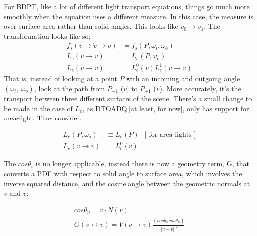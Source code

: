 \message{ !name(test.tex)}\documentclass{article}
\begin{document}
  For BDPT, like a lot of different light transport equations, things go much
more smoothly when the equation uses a different measure. In this case, the
measure is over surface area rather than solid angles. This looks like $v_0
\rightarrow v_1$. The transformation looks like so:
  \begin{align}
    f_s(v \rightarrow \dot{v} \rightarrow \ddot{v}) &= f_s(P, \omega_i,
                                                      \omega_o)\\
    L_e(v \rightarrow \dot{v}) &= L_e(P, \omega_o)\\
    L_e(v \rightarrow \dot{v}) &= L_e^0(v) L_e^1(v \rightarrow \dot{v})
  \end{align}
    That is, instead of looking at a point $P$ with an incoming and outgoing
    angle $(\omega_i,\:\omega_o)$, look at the path from $P_{-1}$ ($v$) to
    $P_{+1}$ ($\ddot{v}$). More accurately, it's the transport between
    three different surfaces of the scene. There's a small change to be made in
the case of $L_e$, as DTOADQ [at least, for now], only has support for
area-light. Thus consider:

  \begin{align}
    L_e(P, \omega_o) &\equiv L_e(P) &\text{[ for area lights ]}\\
    L_e(v \rightarrow \dot{v}) &= L_e^0(v)&
  \end{align}

    The $cos\theta_i$ is no longer applicable, instead there is now a geometry
term, G, that converts a PDF with respect to solid angle to surface area, which
involves the inverse squared distance, and the cosine angle between the
geometric normals at $v$ and $\dot{v}$:

  \begin{align}
    cos\theta_n = v \cdot N(v) \\
    G(v \leftrightarrow \dot{v}) = V(v \rightarrow \dot{v})
        \frac{(cos\theta_n cos\dot{\theta_n})}{|| v - \dot{v}||^2}
  \end{align}
\end{document}
